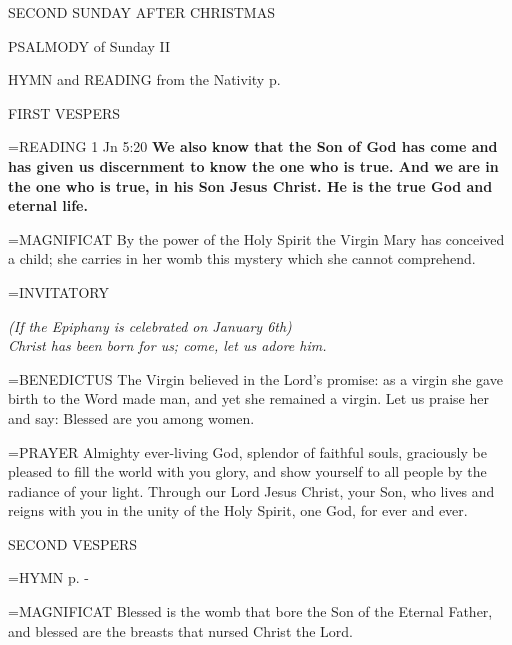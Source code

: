 \begin{center}\normalsize SECOND SUNDAY AFTER CHRISTMAS\\
\end{center}

PSALMODY of Sunday II

HYMN and READING from the Nativity p. \pageref{christmas:nativity}

\begin{flushleft}\normalsize FIRST VESPERS\\\end{flushleft}

\hangindent=\parindent \small{READING}    1 Jn 5:20 \textbf{    We also know that the Son of God has come and has given us discernment to know the one who is true. And we are in the one who is true, in his Son Jesus Christ. He is the true God and eternal life.\\}

\hangindent=\parindent \small{MAGNIFICAT 	By the power of the Holy Spirit the Virgin Mary has conceived a child; she carries in her womb this mystery which she cannot comprehend.\\}

\hangindent=\parindent \small{INVITATORY}
\begin{center}
\textit{(If the Epiphany is celebrated on January 6th)\\}
\textit{Christ has been born for us; come, let us adore him.\\}
\end{center}

\hangindent=\parindent \small{BENEDICTUS 	The Virgin believed in the Lord's promise: as a virgin she gave birth to the Word made man, and yet she remained a virgin. Let us praise her and say: Blessed are you among women.\\}

\hangindent=\parindent \small{PRAYER 	Almighty ever-living God, splendor of faithful souls, graciously be pleased to fill the world with you glory, and show yourself to all people by the radiance of your light. Through our Lord Jesus Christ, your Son, who lives and reigns with you in the unity of the Holy Spirit, one God, for ever and ever.}

\begin{flushleft}\normalsize SECOND VESPERS\\\end{flushleft}

\hangindent=\parindent \small{\uppercase{HYMN} p.  \pageref{christmas:firstHymn} - \pageref{christmas:lastHymn}\\}

\hangindent=\parindent \small{MAGNIFICAT 	Blessed is the womb that bore the Son of the Eternal Father, and blessed are the breasts that nursed Christ the Lord.\\}
